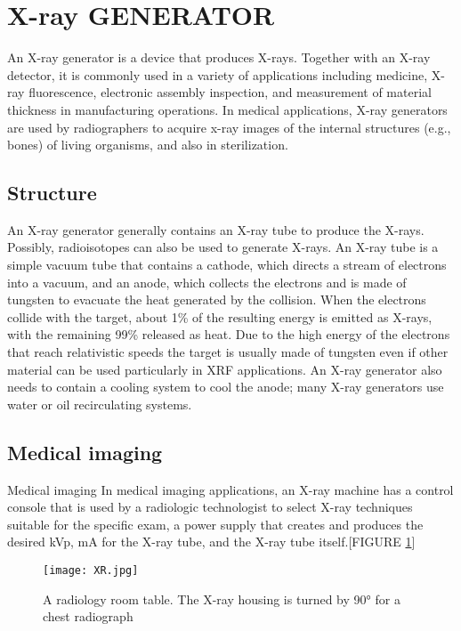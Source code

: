 \documentclass[12pt]{article}
\begin{document}
\section{X-ray GENERATOR}
An X-ray generator is a device that produces X-rays. Together with an X-ray detector, it is commonly used in a variety of applications including medicine, X-ray fluorescence, electronic assembly inspection, and measurement of material thickness in manufacturing operations. In medical applications, X-ray generators are used by radiographers to acquire x-ray images of the internal structures (e.g., bones) of living organisms, and also in sterilization.
\subsection{Structure}
An X-ray generator generally contains an X-ray tube to produce the X-rays.
Possibly, radioisotopes can also be used to generate X-rays.
An X-ray tube is a simple vacuum tube that contains a cathode, which directs a stream of electrons into a vacuum, and an anode, which collects the electrons and is made of tungsten to evacuate the heat generated by the collision.
When the electrons collide with the target, about 1\% of the resulting energy is emitted as X-rays, with the remaining 99\% released as heat.
Due to the high energy of the electrons that reach relativistic speeds the target is usually made of tungsten even if other material can be used particularly in XRF applications.
An X-ray generator also needs to contain a cooling system to cool the anode; many X-ray generators use water or oil recirculating systems.

\subsection{Medical imaging}
Medical imaging In medical imaging applications, an X-ray machine has a control console that is used by a radiologic technologist to select X-ray techniques suitable for the specific exam, a power supply that creates and produces the desired kVp, mA for the X-ray tube, and the X-ray tube itself.[FIGURE \ref{fig_XR}]
\begin{figure}[h]
\centering
\texttt{[image: XR.jpg]}
\caption{A radiology room table. The X-ray housing is turned by 90° for a chest radiograph}
\label{fig_XR}
\end{figure}
\end{document}
